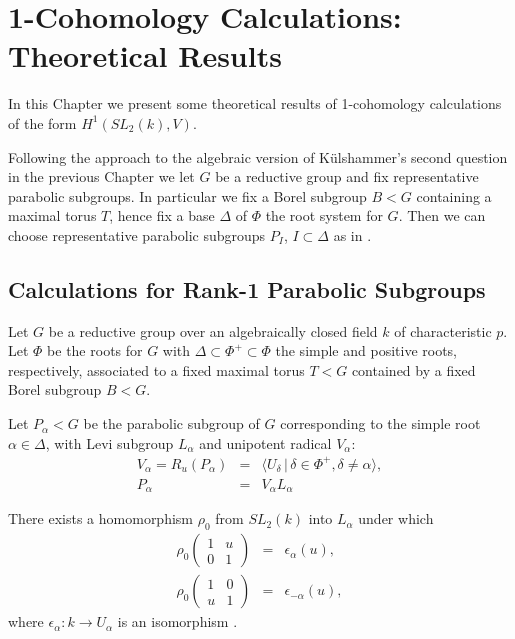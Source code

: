 
\chapter{1-Cohomology Calculations: Theoretical Results}
\label{Chapter5}

In this Chapter we present some theoretical results of 1-cohomology calculations of the form $H^1(SL_2(k), V)$. 

Following the approach to the algebraic version of K\"ulshammer's second question in the previous Chapter we let $G$ be a reductive group and fix representative parabolic subgroups. In particular we fix a Borel subgroup $B<G$ containing a maximal torus $T$, hence fix a base $\Delta$ of $\Phi$ the root system for $G$. Then we can choose representative parabolic subgroups $P_I$, $I \subset \Delta$ as in \cite[\S 30]{humphreys1975linear}.

\section{Calculations for Rank-1 Parabolic Subgroups}

Let $G$ be a reductive group over an algebraically closed field $k$ of characteristic $p$. Let $\Phi$ be the roots for $G$ with $\Delta \subset \Phi^+ \subset \Phi$ the simple and positive roots, respectively, associated to a fixed maximal torus $T < G$ contained by a fixed Borel subgroup $B < G$.

Let $P_\alpha<G$ be the parabolic subgroup of $G$ corresponding to the simple root $\alpha\in\Delta$, with Levi subgroup $L_\alpha$ and unipotent radical $V_\alpha$:
\begin{eqnarray*}
V_\alpha=R_u(P_\alpha) &=& \langle U_\delta \,|\, \delta \in \Phi^+, \delta \neq \alpha \rangle,\\
P_\alpha &=& V_\alpha L_\alpha 
\end{eqnarray*}

There exists a homomorphism $\rho_0$ from $ SL_2(k)$ into $L_\alpha$ under which
\begin{eqnarray*}
\rho_0 \left(\begin{matrix} 1 &  u \\ 0 & 1 \end{matrix} \right) &=& \epsilon_\alpha(u), \\
\rho_0 \left(\begin{matrix} 1 & 0 \\ u & 1 \end{matrix} \right) &=& \epsilon_{-\alpha}(u),
\end{eqnarray*}
where $\epsilon_\alpha : k \rightarrow U_\alpha$ is an isomorphism \cite[Theorem 26.3(c)]{humphreys1975linear}.

